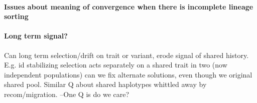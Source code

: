 \documentclass[a4paper,10pt]{article}
\begin{document}
\paragraph{Issues about meaning of convergence when there is incomplete lineage sorting} 


\paragraph{Long term signal?}
Can long term selection/drift on trait or variant, erode signal of shared
history. E.g. id stabilizing selection acts separately on a shared
trait in two (now independent populations) can we fix alternate
solutions, even though we original shared pool. Similar Q about shared
haplotypes whittled away by recom/migration. 
--One Q is do we care? 
\end{document}
